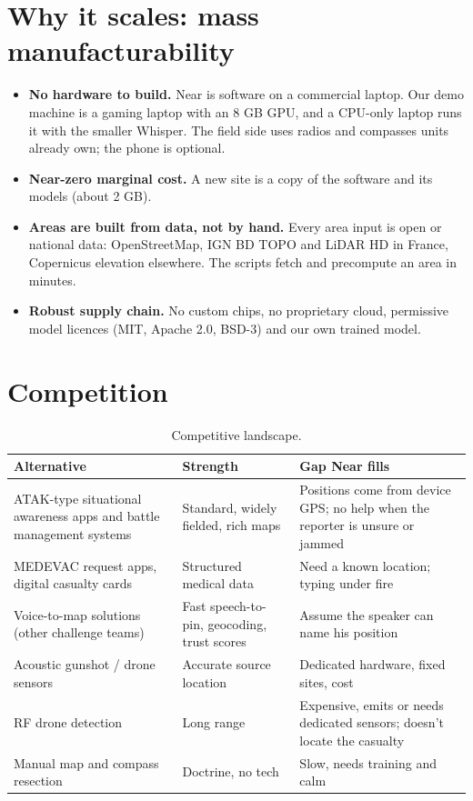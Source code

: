 \section{Why it scales: mass manufacturability}

\begin{itemize}
  \item \textbf{No hardware to build.} Near is software on a commercial laptop. Our demo machine is a gaming laptop with an
        8 GB GPU, and a CPU-only laptop runs it with the smaller Whisper. The field side uses radios and compasses units already
        own; the phone is optional.
  \item \textbf{Near-zero marginal cost.} A new site is a copy of the software and its models (about 2 GB).
  \item \textbf{Areas are built from data, not by hand.} Every area input is open or national data: OpenStreetMap, IGN BD TOPO
        and LiDAR HD in France, Copernicus elevation elsewhere. The scripts fetch and precompute an area in minutes.
  \item \textbf{Robust supply chain.} No custom chips, no proprietary cloud, permissive model licences (MIT, Apache 2.0,
        BSD-3) and our own trained model.
\end{itemize}

\section{Competition}

\begin{table}[htbp]\centering\small
\caption{Competitive landscape.}\label{tab:competition}
\begin{tabularx}{\linewidth}{>{\raggedright}p{3.4cm}XX}
\toprule
Alternative & Strength & Gap Near fills\\
\midrule
ATAK-type situational awareness apps and battle management systems & Standard, widely fielded, rich maps & Positions come from device GPS; no help when the reporter is unsure or jammed\\
MEDEVAC request apps, digital casualty cards & Structured medical data & Need a known location; typing under fire\\
Voice-to-map solutions (other challenge teams) & Fast speech-to-pin, geocoding, trust scores & Assume the speaker can name his position\\
Acoustic gunshot / drone sensors & Accurate source location & Dedicated hardware, fixed sites, cost\\
RF drone detection & Long range & Expensive, emits or needs dedicated sensors; doesn't locate the casualty\\
Manual map and compass resection & Doctrine, no tech & Slow, needs training and calm\\
\bottomrule
\end{tabularx}
\end{table}

